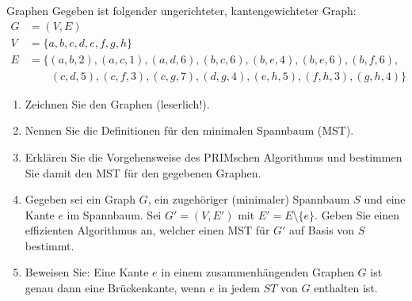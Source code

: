 \documentclass{article}
\begin{document}
\begin{exercise}{Graphen}
  Gegeben ist folgender ungerichteter, kantengewichteter Graph:
  \begin{align*}
    G & = (V, E)                                                                         \\
    V & = \{a, b, c, d, e, f, g, h\}                                                     \\
    E & = \{(a, b, 2), (a, c, 1), (a, d, 6), (b, c, 6), (b, e, 4), (b, e, 6), (b, f, 6), \\
      & \quad\quad(c, d, 5), (c, f, 3), (c, g, 7), (d,g,4), (e,h,5), (f,h,3), (g,h,4)\}
  \end{align*}
  \begin{enumerate}
    \item Zeichnen Sie den Graphen (leserlich!).
    \item Nennen Sie die Definitionen für den minimalen Spannbaum (MST).
    \item Erklären Sie die Vorgehensweise des PRIMschen Algorithmus und bestimmen Sie damit den MST für den gegebenen Graphen.
    \item Gegeben sei ein Graph $G$, ein zugehöriger (minimaler) Spannbaum $S$ und eine Kante $e$ im Spannbaum. Sei $G' = (V, E')$ mit $E' = E \setminus \{e\}$. Geben Sie einen effizienten Algorithmus an, welcher einen MST für $G'$ auf Basis von $S$ bestimmt.
    \item Beweisen Sie: Eine Kante $e$ in einem zusammenhängenden Graphen $G$ ist genau dann eine Brückenkante, wenn $e$ in jedem $ST$ von $G$ enthalten ist.
  \end{enumerate}


\end{exercise}
\end{document}
